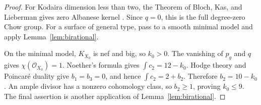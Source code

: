 \begin{proof}
For Kodaira dimension less than two, the Theorem of Bloch, Kas, and
Lieberman gives zero Albanese kernel
\cite[p.~135]{BKL}. Since \(q=0\), this is the full degree-zero
Chow group. For a surface of general type, pass to a smooth minimal
model and apply Lemma~\ref{lem:birational}.

On the minimal model, \(K_{X_0}\) is nef and big, so \(k_0>0\).
The vanishing of \(p_g\) and \(q\) gives
\(\chi(\mathcal O_{X_0})=1\). Noether's formula gives
\(\int c_2=12-k_0\). Hodge theory and Poincar\'e duality give
\(b_1=b_3=0\), and hence \(\int c_2=2+b_2\). Therefore
\(b_2=10-k_0\). An ample divisor has a nonzero cohomology class,
so \(b_2\ge1\), proving \(k_0\le9\). The final assertion is
another application of Lemma~\ref{lem:birational}.
\end{proof}
